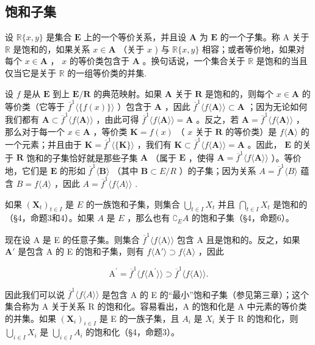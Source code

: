 \subsection{饱和子集}

设 \(\mathbb{R}\{x, y\}\) 是集合 \(\mathbf{E}\) 上的一个等价关系，并且设 \(\mathbf{A}\) 为 \(\mathbf{E}\) 的一个子集。称 A 关于 \(\mathbb{R}\) 是饱和的，如果关系 \(x \in \mathbf{A}\) （关于 \(x\) ) 与 \(\mathbb{R}\{x, y\}\) 相容；或者等价地，如果对每个 \(x \in \mathbf{A}\) ， \(x\) 的等价类包含于 \(\mathbf{A}\) 。换句话说，一个集合关于 \(\mathbb{R}\) 是饱和的当且仅当它是关于 \(\mathbb{R}\) 的一组等价类的并集.

设 \(f\) 是从 \(\mathbf{E}\) 到上 \(\mathbf{E} / \mathbf{R}\) 的典范映射。如果 \(\mathbf{A}\) 关于 \(\mathbf{R}\) 是饱和的，则每个 \(x \in \mathbf{A}\) 的等价类（它等于 \(\overline{f}^1 \langle \{f(x)\} \rangle\) ）包含于 \(\mathbf{A}\) ，因此 \(\overline{f}^1 \langle f\langle \mathbf{A}\rangle \rangle \subset \mathbf{A}\) ；因为无论如何我们都有 \(\mathbf{A} \subset \overline{f}^1 \langle f\langle \mathbf{A}\rangle \rangle\) ，由此可得 \(\overline{f}^1 \langle f\langle \mathbf{A}\rangle \rangle = \mathbf{A}\) 。反之，若 \(\mathbf{A} = \overline{f}^1 \langle f\langle \mathbf{A}\rangle \rangle\) ，那么对于每一个 \(x \in \mathbf{A}\) ，等价类 \(\mathbf{K} = f(x)\) （ \(x\) 关于 \(\mathbf{R}\) 的等价类）是 \(f\langle \mathbf{A}\rangle\) 的一个元素；并且由于 \(\mathbf{K} = \overline{f}^1 \langle \{\mathbf{K}\}\rangle\) ，我们有 \(\mathbf{K} \subset \overline{f}^1 \langle f\langle \mathbf{A}\rangle \rangle = \mathbf{A}\) 。因此， \(\mathbf{E}\) 的关于 \(\mathbf{R}\) 饱和的子集恰好就是那些子集 \(\mathbf{A}\) （属于 \(\mathbf{E}\) ，使得 \(\mathbf{A} = \overline{f}^1 \langle f\langle \mathbf{A}\rangle\rangle\) ）。等价地，它们是 \(\mathbf{E}\) 的形如 \(\overline{f}^1\langle\mathbf{B}\rangle\) （其中 \(\mathbf{B} \subset E / R\) ）的子集；因为关系 \(A = \overline{f}^1\langle B\rangle\) 蕴含 \(B = f\langle A\rangle\) ，因此 \(A = \overline{f}^1\langle f\langle A\rangle\rangle\) .

如果 \((\mathbf{X}_t)_{t\in I}\) 是 \(E\) 的一族饱和子集，则集合 \(\bigcup_{t\in I} X_t\) 并且 \(\bigcap_{t\in I} X_t\) 是饱和的（§4，命题3和4）。如果 \(A\) 是 \(E\) ，那么也有 \(\complement_E A\) 的饱和子集（§4，命题6）。

现在设 A 是 E 的任意子集。则集合 \(\overline{f}^1\langle f\langle \mathrm{A}\rangle \rangle\) 包含 A 且是饱和的。反之，如果 \(\mathbf{A}'\) 是包含 A 的 E 的饱和子集，则有 \(f\langle \mathrm{A}'\rangle \supset f\langle \mathrm{A}\rangle\) ，因此

\[
\mathrm{A} ^ {\prime} = \overline {{f}} ^ {1} \langle f \langle \mathrm{A} ^ {\prime} \rangle \rangle \supset \overline {{f}} ^ {1} \langle f \langle \mathrm{A} \rangle \rangle .
\]

因此我们可以说 \(\overline{f}^1\langle f\langle A\rangle \rangle\) 是包含 A 的 E 的“最小”饱和子集（参见第三章）；这个集合称为 A 关于关系 R 的饱和化。容易看出，A 的饱和化是 A 中元素的等价类的并集。如果 \((\mathbf{X}_{i})_{i\in I}\) 是 E 的一族子集，且 \(A_{i}\) 是 \(X_{i}\) 关于 R 的饱和化，则 \(\bigcup_{i\in I}X_{i}\) 是 \(\bigcup_{i\in I}A_{i}\) 的饱和化（§4，命题3）。

